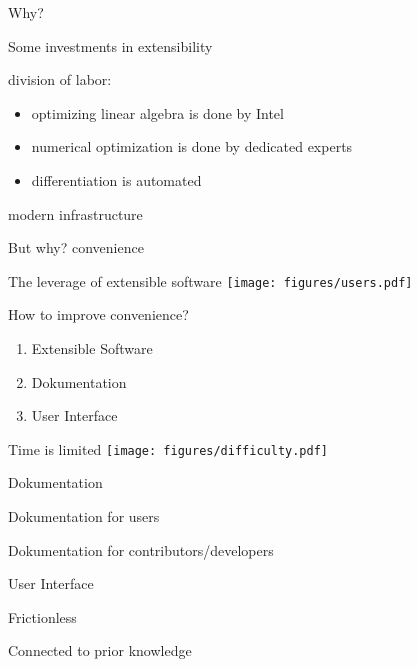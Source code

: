 \documentclass{beamer}
\newenvironment{wideitemize}{
    \itemize\addtolength{\itemsep}{15pt}\addtolength{\topsep}{10pt}}{\enditemize}
\begin{document}
    \begin{frame}{Why?}
        \begin{wideitemize}
        \item Some investments in extensibility
        \item division of labor: \begin{itemize}
            \item optimizing linear algebra is done by Intel
            \item numerical optimization is done by dedicated experts
            \item differentiation is automated
        \end{itemize}
        \item modern infrastructure
        \end{wideitemize}
    \end{frame}

    \begin{frame}{But why?}
    \centering \huge convenience
    \end{frame}
    
    \begin{frame}[c]{The leverage of extensible software}
    \centering
    \texttt{[image: figures/users.pdf]}
    \end{frame}
    
    \begin{frame}{How to improve convenience?}
      \begin{enumerate}
        \item Extensible Software
        \item Dokumentation
        \item User Interface
      \end{enumerate}
    \end{frame}
    
  \begin{frame}[c]{Time is limited}
    \centering
    \texttt{[image: figures/difficulty.pdf]}
  \end{frame}

    \begin{frame}{Dokumentation}
      \begin{wideitemize}
        \item Dokumentation for users
        \item Dokumentation for contributors/developers
      \end{wideitemize}
    \end{frame}

    \begin{frame}{User Interface}
      \begin{wideitemize}
        \item Frictionless
        \item Connected to prior knowledge
      \end{wideitemize}
    \end{frame}
\end{document}
